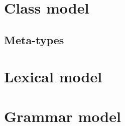 \documentclass[11pt]{beamer}
\begin{document}
\section{Class model}

\begin{frame}
\end{frame}

\subsection{Meta-types}

\begin{frame}
\end{frame}

\section{Lexical model}

\begin{frame}
\end{frame}

\section{Grammar model}

\begin{frame}
\end{frame}
\end{document}
